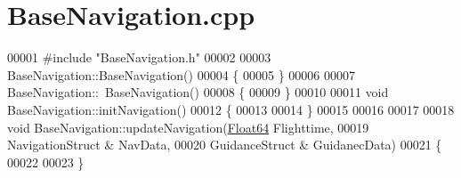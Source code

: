 \hypertarget{_base_navigation_8cpp_source}{}\section{Base\+Navigation.\+cpp}
\label{_base_navigation_8cpp_source}

\begin{DoxyCode}
00001 \textcolor{preprocessor}{#include "BaseNavigation.h"}
00002 
00003 BaseNavigation::BaseNavigation()
00004 \{
00005 \}
00006 
00007 BaseNavigation::~BaseNavigation()
00008 \{
00009 \}
00010 
00011 \textcolor{keywordtype}{void} BaseNavigation::initNavigation()
00012 \{
00013 
00014 \}
00015 
00016 
00017 
00018 \textcolor{keywordtype}{void} BaseNavigation::updateNavigation(\hyperlink{group___tools_ga3f1431cb9f76da10f59246d1d743dc2c}{Float64} Flighttime, 
00019                                       NavigationStruct & NavData, 
00020                                       GuidanceStruct & GuidanecData)
00021 \{
00022 
00023 \}
\end{DoxyCode}
